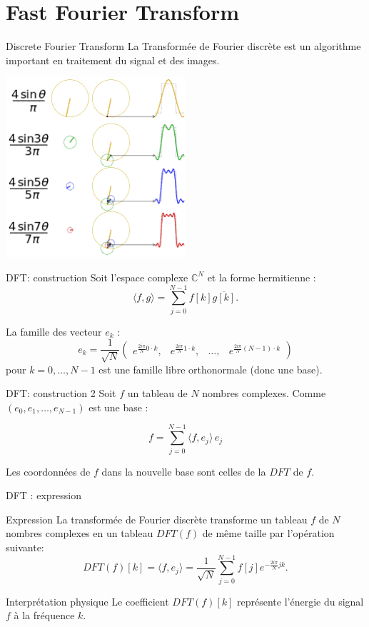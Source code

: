 \section{Fast Fourier Transform}

\begin{frame}{Discrete Fourier Transform}
La Transformée de Fourier discrète est un algorithme important en traitement du signal et des images.

\centering
\includegraphics[width=0.5\textwidth]{images/fourier}

\end{frame}

\begin{frame}{DFT: construction}
Soit l'espace complexe $\mathbb{C}^N$ et la forme hermitienne :
\[\langle f,g \rangle = \sum_{j=0}^{N-1}f[k]\overline{g[k]}.\]

La famille des vecteur $e_k$ :
\[ e_k = \frac{1}{\sqrt{N}}\begin{pmatrix}
e^{\frac{2i\pi}{N} 0\cdot k}, & e^{\frac{2i\pi}{N} 1\cdot k}, & \dots, & e^{\frac{2i\pi}{N} (N-1)\cdot k}
\end{pmatrix}\]
pour $k=0,\ldots,N-1$ est une famille libre orthonormale (donc une base).
\end{frame}

\begin{frame}{DFT: construction 2}
Soit $f$ un tableau de $N$ nombres complexes.
Comme $(e_0,e_1,\dots, e_{N-1})$ est une base :

\[f = \sum_{j=0}^{N-1} \langle f,e_j \rangle \, e_j\]

Les coordonnées de $f$ dans la nouvelle base sont celles de la $DFT$ de $f$.
\end{frame}


\begin{frame}{DFT : expression}
	\begin{alertblock}{Expression}
	La transformée de Fourier discrète transforme un tableau $f$ de $N$ nombres complexes en un tableau $DFT(f)$ de même taille par l'opération suivante:
	\[DFT(f)[k] = \langle f,e_j \rangle =  \frac{1}{\sqrt{N}}\sum_{j=0}^{N-1}f[j]e^{-\frac{2i\pi}{N} jk}.\]
	\end{alertblock}
	
	\begin{exampleblock}{Interprétation physique}
	Le coefficient $DFT(f)[k]$ représente l'énergie du signal $f$ à la fréquence $k$. 
	\end{exampleblock}
\end{frame}

